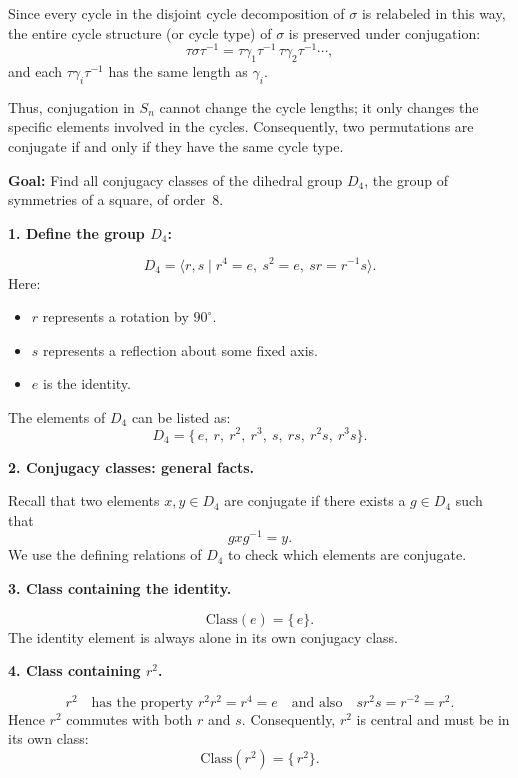 \documentclass[12pt]{article}
\theoremstyle{definition} %
\theoremstyle{plain} %
\begin{document}
\bigskip

\noindent
Since every cycle in the disjoint cycle decomposition of \(\sigma\) is relabeled in this way, the entire cycle structure (or cycle type) of \(\sigma\) is preserved under conjugation:
\[
\tau \sigma \tau^{-1} = \tau\gamma_1\tau^{-1} \, \tau\gamma_2\tau^{-1} \cdots,
\]
and each \(\tau\gamma_i\tau^{-1}\) has the same length as \(\gamma_i\).

\bigskip

\noindent
Thus, conjugation in \(S_n\) cannot change the cycle lengths; it only changes the specific elements involved in the cycles. Consequently, two permutations are conjugate if and only if they have the same cycle type.

\noindent
\textbf{Goal:} Find all conjugacy classes of the dihedral group $D_4$, the group of symmetries of a square, of order~8.

\bigskip

\noindent
\textbf{1. Define the group $D_4$:}

\[
D_4 = \langle r, s \mid r^4 = e,\ s^2 = e,\ sr = r^{-1}s \rangle.
\]
Here:

\begin{itemize}
    \item $r$ represents a rotation by $90^\circ$.
    \item $s$ represents a reflection about some fixed axis.
    \item $e$ is the identity.
\end{itemize}

\noindent
The elements of $D_4$ can be listed as:
\[
D_4 = \{\, e,\ r,\ r^2,\ r^3,\ s,\ rs,\ r^2 s,\ r^3 s \}.
\]

\bigskip

\noindent
\textbf{2. Conjugacy classes: general facts.}

\noindent
Recall that two elements $x,y \in D_4$ are conjugate if there exists a $g \in D_4$ such that
\[
g x g^{-1} = y.
\]
We use the defining relations of $D_4$ to check which elements are conjugate.

\bigskip

\noindent
\textbf{3. Class containing the identity.}

\[
\text{Class}(e) = \{\, e \}.
\]
The identity element is always alone in its own conjugacy class.

\bigskip

\noindent
\textbf{4. Class containing $r^2$.}

\[
r^2 \quad \text{has the property } r^2 r^2 = r^4 = e \quad \text{and also} \quad s r^2 s = r^{-2} = r^2.
\]
Hence $r^2$ commutes with both $r$ and $s$. Consequently, $r^2$ is central and must be in its own class:
\[
\text{Class}(r^2) = \{\,r^2\}.
\]
\end{document}
